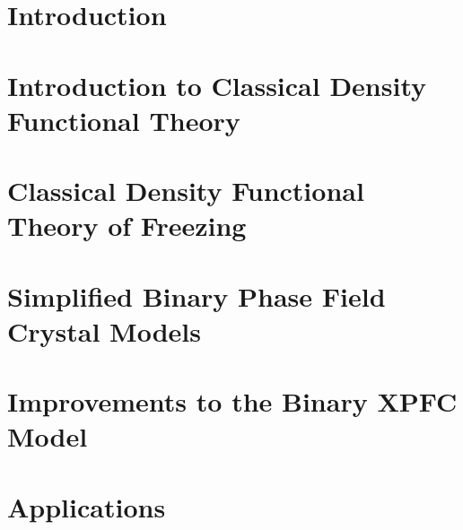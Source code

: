 \documentclass[12pt, letterpaper]{report}
\begin{document}



\doublespacing



\clearpage



\clearpage



\clearpage

\tableofcontents
\listoffigures
\listoftables

\clearpage




\chapter{Introduction}


\chapter{Introduction to Classical Density Functional Theory}


\chapter{Classical Density Functional Theory of Freezing}


\chapter{Simplified Binary Phase Field Crystal Models}


\chapter{Improvements to the Binary XPFC Model}


\chapter{Applications}


\end{document}
